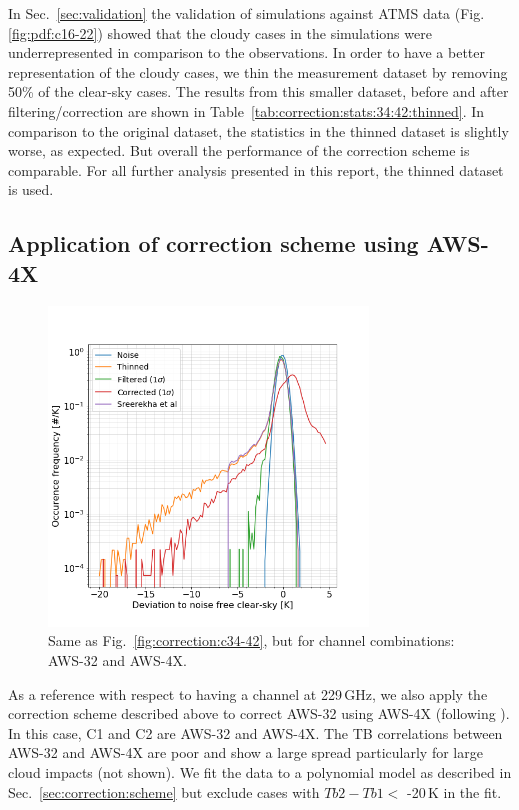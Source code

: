 \documentclass[12pt]{article}
\begin{document}
In Sec.~\ref{sec:validation} the validation of simulations against ATMS data
(Fig.\ref{fig:pdf:c16-22}) showed that the cloudy cases in the simulations were
underrepresented in comparison to the observations. In order to have a better
representation of the cloudy cases, we thin the measurement dataset by
removing 50\% of the clear-sky cases. The results from this smaller dataset, before and after filtering/correction are shown in Table~\ref{tab:correction:stats:34:42:thinned}. In comparison to the
original dataset, the statistics in the thinned dataset is slightly worse, as
expected. But overall the performance of the correction scheme is comparable. 
For all further analysis presented in this report, the thinned dataset is used.
%
\subsection{Application of correction scheme using AWS-4X}
%
\begin{figure}[!t]
	\centering
	\includegraphics[height=85mm]{PDF_corrected_AWS-32_AWS-4X_thinned}
	\caption{Same as Fig.~\ref{fig:correction:c34-42}, but for channel combinations: AWS-32 and AWS-4X.}
	\label{fig:correction:c32-4X:thinned}
\end{figure}
%

As a reference with respect to having a channel at 229\,GHz, we also apply the
correction scheme described above to correct AWS-32 using AWS-4X (following
\citet{rekha2012potential}). In this case, C1 and C2 are AWS-32 and AWS-4X. The
TB correlations between AWS-32 and AWS-4X are poor and show a large spread
particularly for large cloud impacts (not shown). We fit the data to a polynomial model as described in Sec.~\ref{sec:correction:scheme} but exclude cases with $Tb2-Tb1 <$ -20\,K in the fit.
\end{document}
